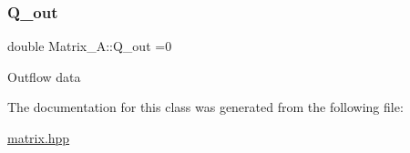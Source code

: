 \subsubsection{\texorpdfstring{Q\+\_\+out}{Q\_out}}
{\footnotesize\ttfamily double Matrix\+\_\+\+A\+::\+Q\+\_\+out =0\hspace{0.3cm}{\ttfamily [private]}}

Outflow data 

The documentation for this class was generated from the following file\+:\begin{DoxyCompactItemize}
\item 
\hyperlink{matrix_8hpp}{matrix.\+hpp}\end{DoxyCompactItemize}
